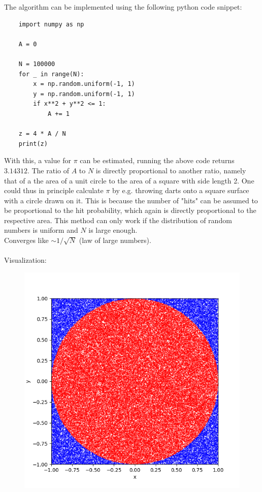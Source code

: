 The algorithm can be implemented using the following python code snippet: \\
\begin{lstlisting}
    import numpy as np
    
    A = 0
    
    N = 100000
    for _ in range(N):
        x = np.random.uniform(-1, 1)
        y = np.random.uniform(-1, 1)
        if x**2 + y**2 <= 1:
            A += 1
    
    z = 4 * A / N
    print(z) \end{lstlisting}
With this, a value for $\pi$ can be estimated, running the above code 
returns $3.14312$. The ratio of $A$ to $N$ is 
directly proportional to another ratio, namely that of a the area of a 
unit circle to the area of a square with side length 2. One could thus 
in principle calculate $\pi$ by e.g. throwing darts onto a square surface with 
a circle drawn on it. This is because the number of "hits" can be 
assumed to be proportional to the hit probability, which again is directly 
proportional to the respective area. This method can only work if the 
distribution of random numbers is uniform and $N$ is large enough. \\
Converges like $\sim 1/\sqrt{N}$ (law of large numbers). \\
\\
Visualization:
\begin{figure}[h!]
    \centering
    \includegraphics[width=.6\textwidth]{./figures/task_03_N100000.png}
\end{figure} \ \\ 

